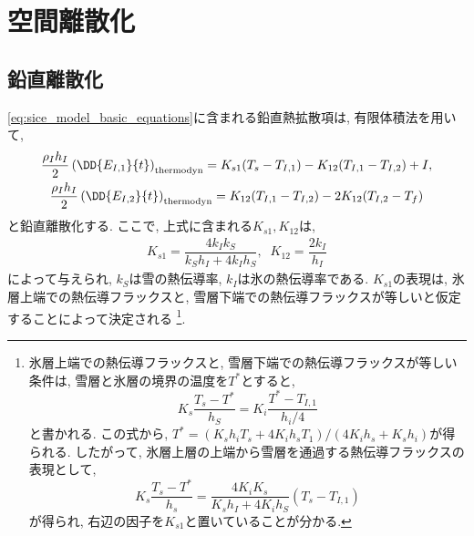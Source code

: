 \section{空間離散化}\label{sice_model_space_scheme}
\subsection{鉛直離散化}\label{sice_model_vspace_scheme}
\eqref{eq:sice_model_basic_equations}に含まれる鉛直熱拡散項は, 
有限体積法を用いて, 
\begin{subequations}
\begin{gather}
 \dfrac{\rho_I h_I}{2} \left(\DD{E_{I,1}}{t}\right)_{\rm thermodyn} 
 = K_{s1} (T_s - T_{I,1}) - K_{12} (T_{I,1} - T_{I,2}) + I, \\
 \dfrac{\rho_I h_I}{2} \left(\DD{E_{I,2}}{t}\right)_{\rm thermodyn} 
  = K_{12} (T_{I,1} - T_{I,2}) - 2K_{12} (T_{I,2} - T_f) 
\end{gather}
\end{subequations}
と鉛直離散化する. 
ここで, 上式に含まれる$K_{s1}, K_{12}$は, 
\begin{align*}
  K_{s1} = \dfrac{4 k_I k_S}{k_S h_I + 4 k_I h_S}, \;\;
  K_{12} = \dfrac{2 k_I}{h_I}
\end{align*}
によって与えられ, $k_S$は雪の熱伝導率, $k_I$は氷の熱伝導率である.  
$K_{s1}$の表現は, 氷層上端での熱伝導フラックスと, 
雪層下端での熱伝導フラックスが等しいと仮定することによって決定される%
\footnote{ 
氷層上端での熱伝導フラックスと, 雪層下端での熱伝導フラックスが等しい条件は, 
雪層と氷層の境界の温度を$T^*$とすると,  
$$
  K_s \dfrac{T_s - T^*}{h_S} = K_i \dfrac{T^* - T_{I,1}}{h_i/4}
$$
と書かれる. この式から, 
$T^* = (K_s h_i T_s + 4 K_i h_s T_1)/(4K_i h_s + K_s h_i)$が得られる. 
したがって, 氷層上層の上端から雪層を通過する熱伝導フラックスの表現として, 
$$
 K_s \dfrac{T_s - T^*}{h_s} 
 = \dfrac{4 K_i K_s}{K_s h_I + 4K_i h_S} (T_s - T_{I,1}) 
$$
が得られ, 右辺の因子を$K_{s1}$と置いていることが分かる.  
}. 

